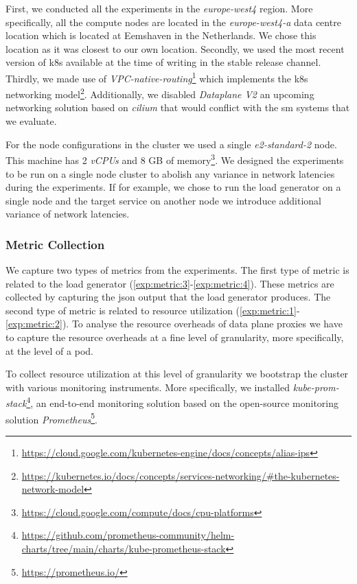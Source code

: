 First, we conducted all the experiments in the \textit{europe-west4} region. More specifically, all the compute nodes are located in the \textit{europe-west4-a} data centre location which is located at Eemshaven in the Netherlands. We chose this location as it was closest to our own location. Secondly, we used the most recent version of \gls{k8s} available at the time of writing in the stable release channel. Thirdly, we made use of \textit{VPC-native-routing}\footnote{\url{https://cloud.google.com/kubernetes-engine/docs/concepts/alias-ips}} which implements the \gls{k8s} networking model\footnote{\url{https://kubernetes.io/docs/concepts/services-networking/\#the-kubernetes-network-model}}. Additionally, we disabled \textit{Dataplane V2} an upcoming networking solution based on \textit{cilium} that would conflict with the \gls{sm} systems that we evaluate.

For the node configurations in the cluster we used a single \textit{e2-standard-2} node. This machine has 2 \textit{vCPUs} and 8 GB of memory\footnote{\url{https://cloud.google.com/compute/docs/cpu-platforms}}. We designed the experiments to be run on a single node cluster to abolish any variance in network latencies during the experiments. If for example, we chose to run the load generator on a single node and the target service on another node we introduce additional variance of network latencies.



\subsubsection{Metric Collection}
\label{sec:experiments:design:environment:cluster}

We capture two types of metrics from the experiments. The first type of metric is related to the load generator (\ref{exp:metric:3}-\ref{exp:metric:4}). These metrics are collected by capturing the \gls{json} output that the load generator produces. The second type of metric is related to resource utilization (\ref{exp:metric:1}-\ref{exp:metric:2}). To analyse the resource overheads of data plane proxies we have to capture the resource overheads at a fine level of granularity, more specifically, at the level of a \gls{pod}.

To collect resource utilization at this level of granularity we bootstrap the cluster with various monitoring instruments. More specifically, we installed \textit{kube-prom-stack}\footnote{\url{https://github.com/prometheus-community/helm-charts/tree/main/charts/kube-prometheus-stack}}, an end-to-end monitoring solution based on the open-source monitoring solution \textit{Prometheus}\footnote{\url{https://prometheus.io/}}.


